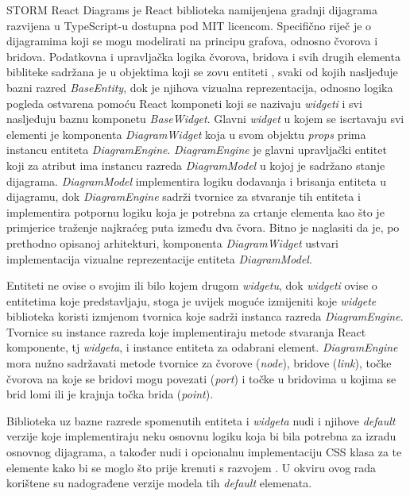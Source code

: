 \documentclass[times, utf8, diplomski, numeric]{fer}
\begin{document}
STORM React Diagrams je React biblioteka namijenjena gradnji dijagrama razvijena u TypeScript-u dostupna pod MIT licencom.
Specifično riječ je o dijagramima koji se mogu modelirati na principu grafova, odnosno čvorova i bridova.
Podatkovna i upravljačka logika čvorova, bridova i svih drugih elementa bibliteke sadržana je u objektima koji se zovu entiteti , svaki od kojih nasljeđuje bazni razred \emph{BaseEntity}, dok je njihova vizualna reprezentacija, odnosno logika pogleda  ostvarena pomoću React komponeti koji se nazivaju \emph{widgeti} i svi nasljeđuju baznu komponetu \emph{BaseWidget}.
Glavni \emph{widget} u kojem se iscrtavaju svi elementi je komponenta \emph{DiagramWidget} koja u svom objektu \emph{props} prima instancu entiteta \emph{DiagramEngine}.
\emph{DiagramEngine} je glavni upravljački entitet koji za atribut ima instancu razreda \emph{DiagramModel} u kojoj je sadržano stanje dijagrama.
\emph{DiagramModel} implementira logiku dodavanja i brisanja entiteta u dijagramu, dok \emph{DiagramEngine} sadrži tvornice  za stvaranje tih entiteta i implementira potpornu logiku koja je potrebna za crtanje elementa kao što je primjerice traženje najkraćeg puta između dva čvora.
Bitno je naglasiti da je, po prethodno opisanoj arhitekturi, komponenta \emph{DiagramWidget} ustvari implementacija vizualne reprezentacije entiteta \emph{DiagramModel}.

Entiteti ne ovise o svojim ili bilo kojem drugom \emph{widgetu}, dok \emph{widgeti} ovise o entitetima koje predstavljaju, stoga je uvijek moguće izmijeniti koje \emph{widgete} biblioteka koristi izmjenom tvornica koje sadrži instanca razreda \emph{DiagramEngine}.
Tvornice su instance razreda koje implementiraju metode stvaranja React komponente, tj \emph{widgeta}, i instance entiteta za odabrani element.
\emph{DiagramEngine} mora nužno sadržavati metode tvornice za čvorove (\emph{node}), bridove (\emph{link}), točke čvorova na koje se bridovi mogu povezati (\emph{port}) i točke u bridovima u kojima se brid lomi ili je krajnja točka brida (\emph{point}).

Biblioteka uz bazne razrede spomenutih entiteta i \emph{widgeta} nudi i njihove \emph{default} verzije koje implementiraju neku osnovnu logiku koja bi bila potrebna za izradu osnovnog dijagrama, a također nudi i opcionalnu implementaciju CSS klasa za te elemente kako bi se moglo što prije krenuti s razvojem \citep{storm_rd}.
U okviru ovog rada korištene su nadograđene verzije modela tih \emph{default} elemenata.
\end{document}
